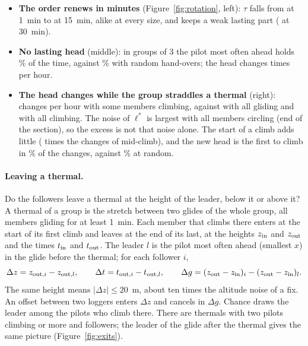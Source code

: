 \begin{itemize}
  \item \textbf{The order renews in minutes} (Figure~\ref{fig:rotation}, left): $\tau$ falls from
        \StRotTauOne{} at 1~min to \StRotTauFifteen{} at 15~min, alike at every size, and keeps a
        weak lasting part (\StRotTauThirty{} at 30~min).
  \item \textbf{No lasting head} (middle): in groups of 3 the pilot most often ahead holds
        \StRotDominant\% of the time, against \StRotDominantNull\% with random hand-overs; the
        head changes \StRotChanges{} times per hour.
  \item \textbf{The head changes while the group straddles a thermal} (right): \StRotMixed{}
        changes per hour with some members climbing, against \StRotGliding{} with all gliding and
        \StRotClimbing{} with all climbing. The noise of $\ell^*$ is largest with all members
        circling (end of the section), so the excess is not that noise alone. The start of a climb
        adds little (\StRotFirstOverMid{} times the changes of mid-climb), and the new head is the
        first to climb in \StRotFirst\% of the changes, against \StRotFirstExp\% at random.
\end{itemize}

\paragraph{Leaving a thermal.}\label{sec:exits} Do the followers leave a thermal at the height of
the leader, below it or above it? A thermal of a group is the stretch between two glides of the
whole group, all members gliding for at least 1~min. Each member that climbs there enters at the
start of its first climb and leaves at the end of its last, at the heights $z_{\rm in}$ and
$z_{\rm out}$ and the times $t_{\rm in}$ and $t_{\rm out}$. The leader $l$ is the pilot most often
ahead (smallest $x$) in the glide before the thermal; for each follower $i$,
\begin{equation}\label{eq:exit}
\Delta z=z_{{\rm out},i}-z_{{\rm out},l},\qquad
\Delta t=t_{{\rm out},i}-t_{{\rm out},l},\qquad
\Delta g=(z_{\rm out}-z_{\rm in})_i-(z_{\rm out}-z_{\rm in})_l .
\end{equation}
The same height means $|\Delta z|\le 20$~m, about ten times the altitude noise of a fix. An offset
between two loggers enters $\Delta z$ and cancels in $\Delta g$. Chance draws the leader among the
pilots who climb there. There are \StExThermals{} thermals with two pilots climbing or more and
\StExRows{} followers; the leader of the glide after the thermal gives the same picture
(Figure~\ref{fig:exits}).

